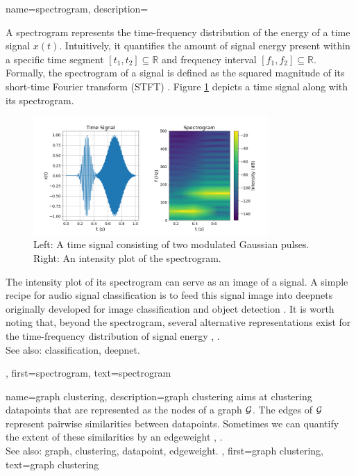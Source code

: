 {name={spectrogram},
	description={A spectrogram represents the time-frequency distribution of the energy of a time signal $x(t)$.  
		Intuitively, it quantifies the amount of signal energy present within a specific time segment 
		$[t_{1},t_{2}] \subseteq \mathbb{R}$ and frequency interval $[f_{1},f_{2}]\subseteq \mathbb{R}$. 
		Formally, the spectrogram of a signal is defined as the squared magnitude of its 
		short-time Fourier transform (STFT) \cite{cohen1995time}.
        Figure \ref{fig:spectrogram_dict} depicts a time signal along with its spectrogram. 
	\begin{figure}[H]
		\centering
		\includegraphics[width=0.8\textwidth]{assets/spectrogram.png}
		\caption{Left: A time signal consisting of two modulated Gaussian pulses. Right: An intensity 
		plot of the spectrogram.
		\label{fig:spectrogram_dict}}
	\end{figure}
        		The intensity plot of its spectrogram can serve as an image of a signal. A 
		simple recipe for audio signal \gls{classification} is to feed this signal image 
		into \glspl{deepnet} originally developed for image \gls{classification} and object detection \cite{Li:2022aa}. 
		It is worth noting that, beyond the spectrogram, several alternative representations exist 
		for the time-frequency distribution of signal energy \cite{TimeFrequencyAnalysisBoashash}, \cite{MallatBook}.
					\\ 
		See also: \gls{classification}, \gls{deepnet}.}, 
	first={spectrogram},
	text={spectrogram} 
}

{name={graph clustering},
	description={\Gls{graph} \gls{clustering} aims at 
		\gls{clustering} \glspl{datapoint} that are represented as the nodes 
		of a \gls{graph} $\mathcal{G}$. The edges of $\mathcal{G}$ represent 
		pairwise similarities between \glspl{datapoint}. Sometimes we
		can quantify the extent of these similarities by an \gls{edgeweight} \cite{FlowSpecClustering2021}, \cite{Luxburg2007}.
					\\ 
		See also: \gls{graph}, \gls{clustering}, \gls{datapoint}, \gls{edgeweight}. }, 
	first={graph clustering},
	text={graph clustering} 
}

